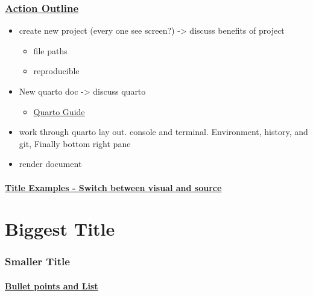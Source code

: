 \documentclass[
  letterpaper,
  DIV=11,
  numbers=noendperiod]{scrartcl}
\let\oldparagraph\paragraph
\renewcommand{\paragraph}[1]{\oldparagraph{#1}\mbox{}}
\providecommand{\tightlist}{%
  \setlength{\itemsep}{0pt}\setlength{\parskip}{0pt}}\usepackage{longtable,booktabs,array}
\begin{document}
\hypertarget{action-outline}{%
\subsubsection{\texorpdfstring{\ul{Action
Outline}}{Action Outline}}\label{action-outline}}

\begin{itemize}
\tightlist
\item
  create new project (every one see screen?) -\textgreater{} discuss
  benefits of project

  \begin{itemize}
  \tightlist
  \item
    file paths
  \item
    reproducible
  \end{itemize}
\item
  New quarto doc -\textgreater{} discuss quarto

  \begin{itemize}
  \tightlist
  \item
    \href{https://quarto.org/docs/guide/}{Quarto Guide}
  \end{itemize}
\item
  work through quarto lay out. console and terminal. Environment,
  history, and git, Finally bottom right pane
\item
  render document
\end{itemize}

\hypertarget{title-examples---switch-between-visual-and-source}{%
\paragraph{\texorpdfstring{\ul{Title Examples - Switch between visual
and
source}}{Title Examples - Switch between visual and source}}\label{title-examples---switch-between-visual-and-source}}

\hypertarget{biggest-title}{%
\section{Biggest Title}\label{biggest-title}}

\hypertarget{smaller-title}{%
\subsubsection{Smaller Title}\label{smaller-title}}

\hypertarget{bullet-points-and-list}{%
\paragraph{\texorpdfstring{\ul{Bullet points and
List}}{Bullet points and List}}\label{bullet-points-and-list}}
\end{document}
